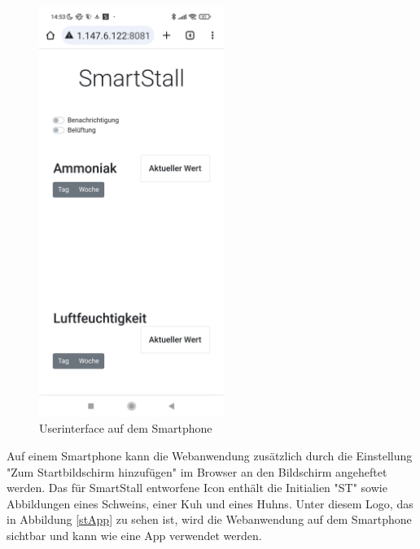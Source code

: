 \documentclass[conference]{IEEEtran}
\begin{document}
\begin{figure}[H]
	\centering
	\includegraphics[width=60mm]{fig/uiHandy.jpg}
	\caption{Userinterface auf dem Smartphone}
	\label{uiHandy}
\end{figure}
Auf einem Smartphone kann die Webanwendung zusätzlich durch die Einstellung "Zum Startbildschirm hinzufügen" im Browser an den Bildschirm angeheftet werden. Das für SmartStall entworfene Icon enthält die Initialien "ST" sowie Abbildungen eines Schweins, einer Kuh und eines Huhns. Unter diesem Logo, das in Abbildung \ref{stApp} zu sehen ist, wird die Webanwendung auf dem Smartphone sichtbar und kann wie eine App verwendet werden.
\end{document}
